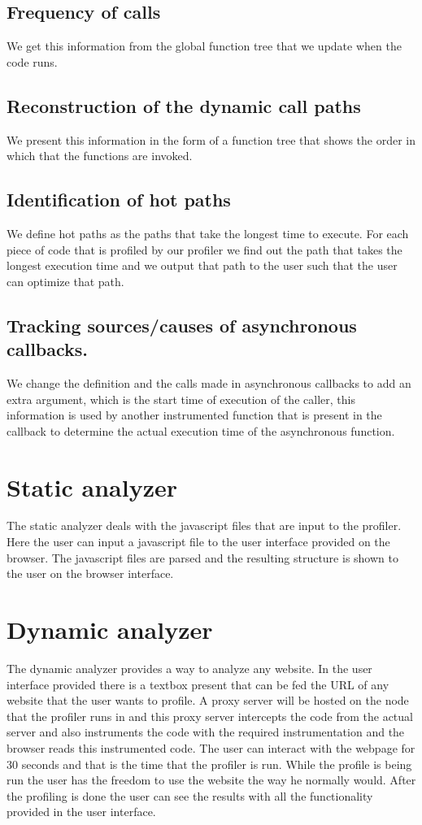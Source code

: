 \documentclass[a4paper, 12pt, notitlepage]{report}
\begin{document}
\subsection{Frequency of calls}
%
We get this information from the global function tree that we update when the code runs.

\subsection{Reconstruction of the dynamic call paths}
%
We present this information in the form of a function tree that shows the order in which that the functions are invoked.

\subsection{Identification of hot paths}
%
We define hot paths as the paths that take the longest time to execute. For each piece of code that is profiled by our profiler we find out the path that takes the longest execution time and we output that path to the user such that the user can optimize that path.

\subsection{Tracking sources/causes of asynchronous callbacks. }
%
We change the definition and the calls made in asynchronous callbacks to add an extra argument, which is the start time of execution of the caller, this information is used by another instrumented function that is present in the callback to determine the actual execution time of the asynchronous function.

\section{Static analyzer}
%
The static analyzer deals with the javascript files that are input to the profiler. Here the user can input a javascript file to the user interface provided on the browser. The javascript files are parsed and the resulting structure is shown to the user on the browser interface.

\section{Dynamic analyzer}
%
The dynamic analyzer provides a way to analyze any website. In the user interface provided there is a textbox present that can be fed the URL of any website that the user wants to profile. A proxy server will be hosted on the node that the profiler runs in and this proxy server intercepts the code from the actual server and also instruments the code with the required instrumentation and the browser reads this instrumented code. The user can interact with the webpage for 30 seconds and that is the time that the profiler is run. While the profile is being run the user has the freedom to use the website the way he normally would. After the profiling is done the user can see the results with all the functionality provided in the user interface.
\end{document}
